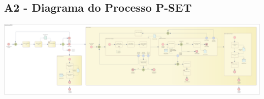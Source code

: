 \documentclass{article}
\begin{document}
\begin{landscape}
	\section*{A2 - Diagrama do Processo P-SET}
	\vspace*{\fill}
	\begin{center}
		\includegraphics[width=1.5\textheight,height=\textwidth,keepaspectratio]{A2-2}
	\end{center}
	\vspace*{\fill}
\end{landscape}

\pagebreak
\end{document}
